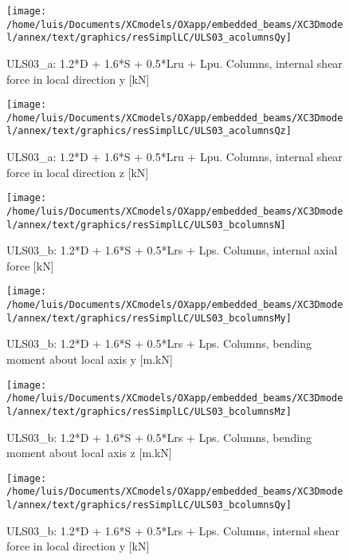 \begin{figure}
\begin{center}
\texttt{[image: /home/luis/Documents/XCmodels/OXapp/embedded\_beams/XC3Dmodel/annex/text/graphics/resSimplLC/ULS03\_acolumnsQy]}
\caption{ULS03_a: 1.2*D + 1.6*S + 0.5*Lru + Lpu. Columns, internal shear force in local direction y [kN]}
\end{center}
\end{figure}
\begin{figure}
\begin{center}
\texttt{[image: /home/luis/Documents/XCmodels/OXapp/embedded\_beams/XC3Dmodel/annex/text/graphics/resSimplLC/ULS03\_acolumnsQz]}
\caption{ULS03_a: 1.2*D + 1.6*S + 0.5*Lru + Lpu. Columns, internal shear force in local direction z [kN]}
\end{center}
\end{figure}
\clearpage
\begin{figure}
\begin{center}
\texttt{[image: /home/luis/Documents/XCmodels/OXapp/embedded\_beams/XC3Dmodel/annex/text/graphics/resSimplLC/ULS03\_bcolumnsN]}
\caption{ULS03_b: 1.2*D + 1.6*S + 0.5*Lrs + Lps. Columns, internal axial force [kN]}
\end{center}
\end{figure}
\begin{figure}
\begin{center}
\texttt{[image: /home/luis/Documents/XCmodels/OXapp/embedded\_beams/XC3Dmodel/annex/text/graphics/resSimplLC/ULS03\_bcolumnsMy]}
\caption{ULS03_b: 1.2*D + 1.6*S + 0.5*Lrs + Lps. Columns, bending moment about local axis y [m.kN]}
\end{center}
\end{figure}
\begin{figure}
\begin{center}
\texttt{[image: /home/luis/Documents/XCmodels/OXapp/embedded\_beams/XC3Dmodel/annex/text/graphics/resSimplLC/ULS03\_bcolumnsMz]}
\caption{ULS03_b: 1.2*D + 1.6*S + 0.5*Lrs + Lps. Columns, bending moment about local axis z [m.kN]}
\end{center}
\end{figure}
\begin{figure}
\begin{center}
\texttt{[image: /home/luis/Documents/XCmodels/OXapp/embedded\_beams/XC3Dmodel/annex/text/graphics/resSimplLC/ULS03\_bcolumnsQy]}
\caption{ULS03_b: 1.2*D + 1.6*S + 0.5*Lrs + Lps. Columns, internal shear force in local direction y [kN]}
\end{center}
\end{figure}
